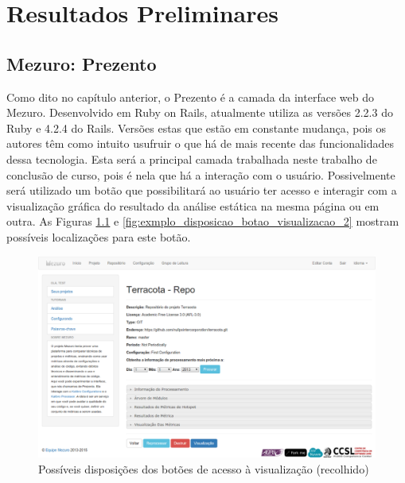 \chapter{Resultados Preliminares}

\section{Mezuro: Prezento}



Como dito no capítulo anterior, o Prezento é a camada da interface web do
Mezuro. Desenvolvido em Ruby on Rails, atualmente utiliza as versões 2.2.3 do
Ruby e 4.2.4 do Rails. Versões estas que estão em constante mudança, pois os
autores têm como intuito usufruir o que há de mais recente das funcionalidades
dessa tecnologia. Esta será a principal camada trabalhada neste trabalho de
conclusão de curso, pois é
nela que há a interação com o usuário. Possivelmente será utilizado um botão que
possibilitará ao usuário ter acesso e interagir com a visualização gráfica do
resultado da análise estática na mesma página ou em outra. As Figuras
\ref{fig:exmplo_disposicao_botao_visualizacao_1} e
\ref{fig:exmplo_disposicao_botao_visualizacao_2} mostram possíveis localizações
para este botão.


\begin{figure}[!htb]
	\centering
    \includegraphics[keepaspectratio=true,scale=0.33]
    {figuras/exmplo_disposicao_botao_visualizacao_1.eps}
  \caption{Possíveis disposições dos botões de acesso à visualização (recolhido)}
  \label{fig:exmplo_disposicao_botao_visualizacao_1}
\end{figure}

